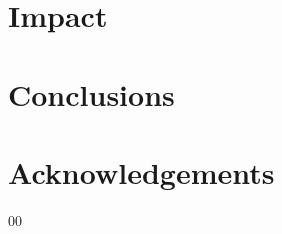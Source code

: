 \documentclass[preprint,12pt, a4paper]{elsarticle}
\begin{document}
\section{Impact}



\section{Conclusions}



\section*{Acknowledgements}
\label{}



\begin{thebibliography}{00}


\end{thebibliography}
\end{document}
